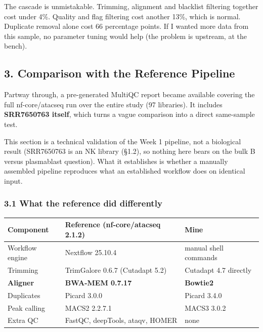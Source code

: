 \documentclass[
  11pt,
  a4paper,
]{article}
\begin{document}
The cascade is unmistakable. Trimming, alignment and blacklist filtering
together cost under 4\%. Quality and flag filtering cost another 13\%,
which is normal. Duplicate removal alone cost 66 percentage points. If I
wanted more data from this sample, no parameter tuning would help (the
problem is upstream, at the bench).

\hypertarget{comparison-with-the-reference-pipeline}{%
\subsection{3. Comparison with the Reference
Pipeline}\label{comparison-with-the-reference-pipeline}}

Partway through, a pre-generated MultiQC report became available
covering the full nf-core/atacseq run over the entire study (97
libraries). It includes \textbf{SRR7650763 itself}, which turns a vague
comparison into a direct same-sample test.

This section is a technical validation of the Week 1 pipeline, not a
biological result (SRR7650763 is an NK library (§1.2), so nothing here
bears on the bulk B versus plasmablast question). What it establishes is
whether a manually assembled pipeline reproduces what an established
workflow does on identical input.

\hypertarget{what-the-reference-did-differently}{%
\subsubsection{3.1 What the reference did
differently}\label{what-the-reference-did-differently}}

\begin{longtable}[]{@{}lll@{}}
\toprule\noalign{}
Component & Reference (nf-core/atacseq 2.1.2) & Mine \\
\midrule\noalign{}
\endhead
\bottomrule\noalign{}
\endlastfoot
Workflow engine & Nextflow 25.10.4 & manual shell commands \\
Trimming & TrimGalore 0.6.7 (Cutadapt 5.2) & Cutadapt 4.7 directly \\
\textbf{Aligner} & \textbf{BWA-MEM 0.7.17} & \textbf{Bowtie2} \\
Duplicates & Picard 3.0.0 & Picard 3.4.0 \\
Peak calling & MACS2 2.2.7.1 & MACS3 3.0.2 \\
Extra QC & FastQC, deepTools, ataqv, HOMER & none \\
\end{longtable}
\end{document}
